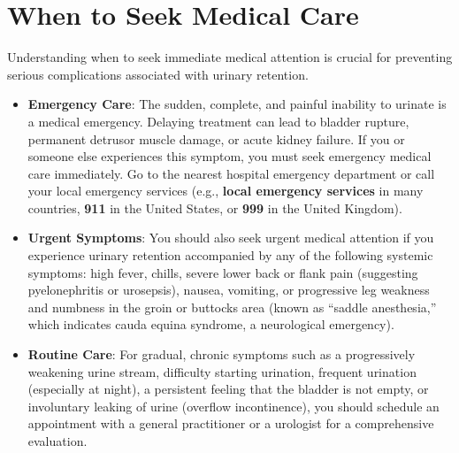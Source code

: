 \section*{When to Seek Medical Care}
Understanding when to seek immediate medical attention is crucial for preventing serious complications associated with urinary retention.
\begin{itemize}
    \item \textbf{Emergency Care}: The sudden, complete, and painful inability to urinate is a medical emergency. Delaying treatment can lead to bladder rupture, permanent detrusor muscle damage, or acute kidney failure. If you or someone else experiences this symptom, you must seek emergency medical care immediately. Go to the nearest hospital emergency department or call your local emergency services (e.g., \textbf{local emergency services} in many countries, \textbf{911} in the United States, or \textbf{999} in the United Kingdom).
    \item \textbf{Urgent Symptoms}: You should also seek urgent medical attention if you experience urinary retention accompanied by any of the following systemic symptoms: high fever, chills, severe lower back or flank pain (suggesting pyelonephritis or urosepsis), nausea, vomiting, or progressive leg weakness and numbness in the groin or buttocks area (known as ``saddle anesthesia,'' which indicates cauda equina syndrome, a neurological emergency).
    \item \textbf{Routine Care}: For gradual, chronic symptoms such as a progressively weakening urine stream, difficulty starting urination, frequent urination (especially at night), a persistent feeling that the bladder is not empty, or involuntary leaking of urine (overflow incontinence), you should schedule an appointment with a general practitioner or a urologist for a comprehensive evaluation.
\end{itemize}


